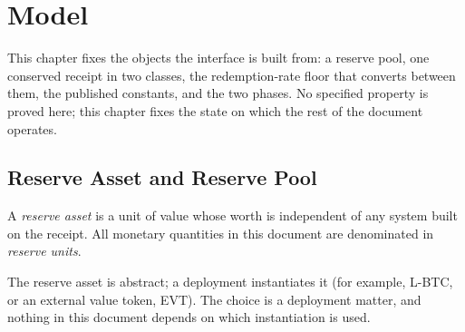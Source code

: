 \documentclass[../main.tex]{subfiles}
\begin{document}
%
%
%

\section{Model}
\label{sec:attestation:model}

This chapter fixes the objects the interface is built from: a reserve pool, one conserved
receipt in two classes, the redemption-rate floor that converts between them, the published
constants, and the two phases. No specified property is proved here; this chapter fixes the
state on which the rest of the document operates.

\subsection{Reserve Asset and Reserve Pool}
\label{sec:model:reserve}

\begin{definition}
    \label{def:model:reserve-asset}
    A \emph{reserve asset} is a unit of value whose worth is independent of any system
    built on the receipt. All monetary quantities in this document are denominated in
    \emph{reserve units}.
\end{definition}

\begin{remark}[Instantiations]
    \label{rem:model:instantiations}
    The reserve asset is abstract; a deployment instantiates it (for example, L-BTC, or an
    external value token, EVT). The choice is a deployment matter, and nothing in this
    document depends on which instantiation is used.
\end{remark}
\end{document}

